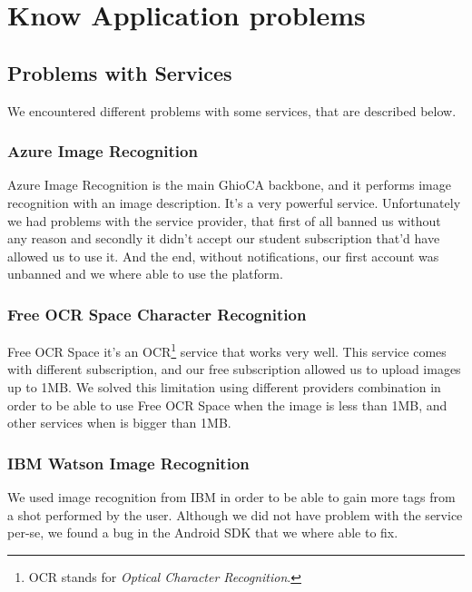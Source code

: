 \section{Know Application problems}

\subsection{Problems with Services}

We encountered different problems with some services, that are described below.

\subsubsection{Azure Image Recognition}

Azure Image Recognition is the main GhioCA backbone, and it performs image 
recognition with an image description. It's a very powerful service. 
Unfortunately we had problems with the service provider, that first of 
all banned us without any reason and secondly it didn't accept our student 
subscription that'd have allowed us to use it.
And the end, without notifications, our first account was unbanned and we where 
able to use the platform.

\subsubsection{Free OCR Space Character Recognition}

Free OCR Space it's an OCR\footnote{OCR stands for \textit{Optical Character 
Recognition}.} service that works very well. This service comes with different 
subscription, and our free subscription allowed us to upload images up to 1MB. 
We solved this limitation using different providers combination in order to be 
able to use Free OCR Space when the image is less than 1MB, and other services 
when is bigger than 1MB. %

\subsubsection{IBM Watson Image Recognition}

We used image recognition from IBM in order to be able to gain more tags from 
a shot performed by the user. %
Although we did not have problem with the service per-se, we found a bug in the 
Android SDK that we where able to fix. %


